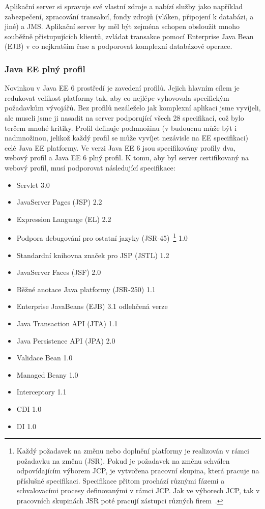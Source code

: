 \documentclass[122pt,oneside]{fithesis}
\begin{document}
Aplikační server si spravuje své vlastní zdroje a nabízí služby jako například zabezpečení, zpracování transakcí, fondy zdrojů (vláken, připojení k databázi, a jiné) a JMS. Aplikační server by měl být zejména schopen obsloužit mnoho souběžně přistupujících klientů, zvládat transakce pomocí Enterprise Java Bean (EJB) v co nejkratším čase a podporovat komplexní databázové operace.


\subsubsection{Java EE plný profil}
\label{profily}
Novinkou v Java EE 6 prostředí je zavedení profilů. Jejich hlavním cílem je redukovat velikost platformy tak, aby co nejlépe vyhovovala specifickým požadavkům vývojářů. Bez profilů nezáleželo jak komplexní aplikaci jsme vyvíjeli, ale museli jsme ji nasadit na server podporující všech 28 specifikací, což bylo terčem mnohé kritiky. Profil definuje podmnožinu (v budoucnu může být i nadmnožinou, jelikož každý profil se může vyvíjet nezávisle na EE specifikaci) celé Java EE platformy. Ve verzi Java EE 6 jsou specifikovány profily dva, webový profil a Java EE 6 plný profil. K tomu, aby byl server certifikovaný na webový profil, musí podporovat následující specifikace:
\begin{itemize}
  \item Servlet 3.0
  \item JavaServer Pages (JSP) 2.2
  \item Expression Language (EL) 2.2
  \item Podpora debugování pro ostatní jazyky (JSR-45)~\footnote{Každý požadavek na změnu nebo doplnění platformy je realizován v rámci požadavku na změnu (JSR). Pokud je požadavek na změnu schválen odpovídajícím výborem JCP, je vytvořena pracovní skupina, která pracuje na příslušné specifikaci. Specifikace přitom prochází různými fázemi a schvalovacími procesy definovanými v rámci JCP. Jak ve výborech JCP, tak v pracovních skupinách JSR poté pracují zástupci různých firem~\cite{wikiJSR}.} 1.0
  \item Standardní knihovna značek pro JSP (JSTL) 1.2
  \item JavaServer Faces (JSF) 2.0
  \item Běžné anotace Java platformy (JSR-250) 1.1
  \item Enterprise JavaBeans (EJB) 3.1 odlehčená verze
  \item Java Transaction API (JTA) 1.1
  \item Java Persistence API (JPA) 2.0
  \item Validace Bean 1.0
  \item Managed Beany 1.0
  \item Interceptory 1.1
  \item CDI 1.0
  \item DI 1.0
\end{itemize}
\end{document}
